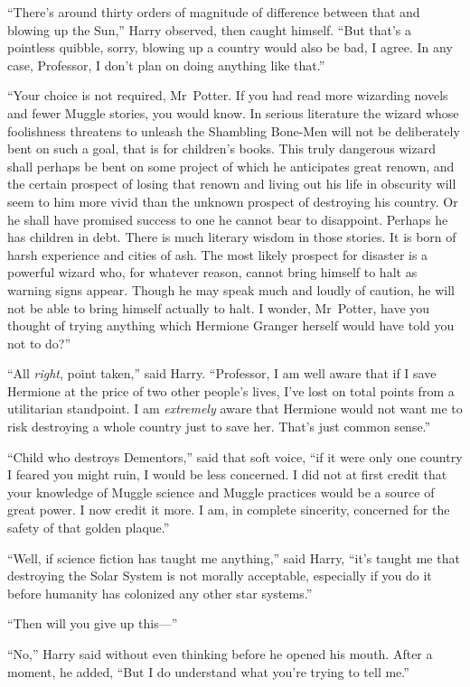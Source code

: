 “There’s around thirty orders of magnitude of difference between that and blowing up the Sun,” Harry observed, then caught himself. “But that’s a pointless quibble, sorry, blowing up a country would also be bad, I agree. In any case, Professor, I don’t plan on doing anything like that.”

“Your choice is not required, Mr~Potter. If you had read more wizarding novels and fewer Muggle stories, you would know. In serious literature the wizard whose foolishness threatens to unleash the Shambling Bone-Men will not be deliberately bent on such a goal, that is for children’s books. This truly dangerous wizard shall perhaps be bent on some project of which he anticipates great renown, and the certain prospect of losing that renown and living out his life in obscurity will seem to him more vivid than the unknown prospect of destroying his country. Or he shall have promised success to one he cannot bear to disappoint. Perhaps he has children in debt. There is much literary wisdom in those stories. It is born of harsh experience and cities of ash. The most likely prospect for disaster is a powerful wizard who, for whatever reason, cannot bring himself to halt as warning signs appear. Though he may speak much and loudly of caution, he will not be able to bring himself actually to halt. I wonder, Mr~Potter, have you thought of trying anything which Hermione Granger herself would have told you not to do?”

“All \emph{right}, point taken,” said Harry. “Professor, I am well aware that if I save Hermione at the price of two other people’s lives, I’ve lost on total points from a utilitarian standpoint. I am \emph{extremely} aware that Hermione would not want me to risk destroying a whole country just to save her. That’s just common sense.”

“Child who destroys Dementors,” said that soft voice, “if it were only one country I feared you might ruin, I would be less concerned. I did not at first credit that your knowledge of Muggle science and Muggle practices would be a source of great power. I now credit it more. I am, in complete sincerity, concerned for the safety of that golden plaque.”

“Well, if science fiction has taught me anything,” said Harry, “it’s taught me that destroying the Solar System is not morally acceptable, especially if you do it before humanity has colonized any other star systems.”

“Then will you give up this—”

“No,” Harry said without even thinking before he opened his mouth. After a moment, he added, “But I do understand what you’re trying to tell me.”

